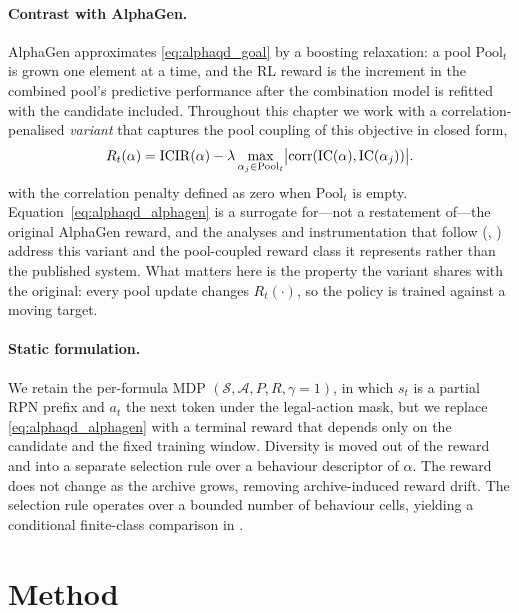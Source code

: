 \paragraph{Contrast with AlphaGen.} AlphaGen approximates \eqref{eq:alphaqd_goal} by a boosting relaxation: a pool $\mathrm{Pool}_t$ is grown one element at a time, and the RL reward is the increment in the combined pool's predictive performance after the combination model is refitted with the candidate included. Throughout this chapter we work with a correlation-penalised \emph{variant} that captures the pool coupling of this objective in closed form,
\begin{equation}
\label{eq:alphaqd_alphagen}
R_t(\alpha) = \mathrm{ICIR}(\alpha) - \lambda\max_{\alpha_j\in\mathrm{Pool}_t}\bigl|\operatorname{corr}(\mathrm{IC}(\alpha),\mathrm{IC}(\alpha_j))\bigr|.
\end{equation}
with the correlation penalty defined as zero when $\mathrm{Pool}_t$ is empty. Equation~\eqref{eq:alphaqd_alphagen} is a surrogate for---not a restatement of---the original AlphaGen reward, and the analyses and instrumentation that follow (, ) address this variant and the pool-coupled reward class it represents rather than the published system. What matters here is the property the variant shares with the original: every pool update changes $R_t(\cdot)$, so the policy is trained against a moving target.

\paragraph{Static formulation.} We retain the per-formula MDP $(\mathcal{S},\mathcal{A},P,R,\gamma=1)$, in which $s_t$ is a partial RPN prefix and $a_t$ the next token under the legal-action mask, but we replace \eqref{eq:alphaqd_alphagen} with a terminal reward that depends only on the candidate and the fixed training window. Diversity is moved out of the reward and into a separate selection rule over a behaviour descriptor of $\alpha$. The reward does not change as the archive grows, removing archive-induced reward drift. The selection rule operates over a bounded number of behaviour cells, yielding a conditional finite-class comparison in .

\section{Method}
\label{sec:alphaqd_method}

